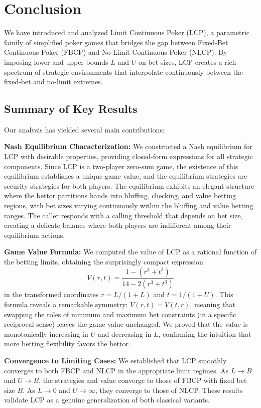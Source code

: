 \documentclass[../../main/main.tex]{subfiles}
\begin{document}
\section{Conclusion}
\label{sec:conclusion}
We have introduced and analyzed Limit Continuous Poker (LCP), a parametric family of simplified poker games that bridges the gap between Fixed-Bet Continuous Poker (FBCP) and No-Limit Continuous Poker (NLCP). By imposing lower and upper bounds $L$ and $U$ on bet sizes, LCP creates a rich spectrum of strategic environments that interpolate continuously between the fixed-bet and no-limit extremes.

\subsection{Summary of Key Results}

Our analysis has yielded several main contributions:

\textbf{Nash Equilibrium Characterization:} We constructed a Nash equilibrium for LCP with desirable properties, providing closed-form expressions for all strategic components. Since LCP is a two-player zero-sum game, the existence of this equilibrium establishes a unique game value, and the equilibrium strategies are security strategies for both players. The equilibrium exhibits an elegant structure where the bettor partitions hands into bluffing, checking, and value betting regions, with bet sizes varying continuously within the bluffing and value betting ranges. The caller responds with a calling threshold that depends on bet size, creating a delicate balance where both players are indifferent among their equilibrium actions.

\textbf{Game Value Formula:} We computed the value of LCP as a rational function of the betting limits, obtaining the surprisingly compact expression
\[
V(r,t) = \frac{1 - (r^3 + t^3)}{14 - 2(r^3 + t^3)}
\]
in the transformed coordinates $r = L/(1+L)$ and $t = 1/(1+U)$. This formula reveals a remarkable symmetry: $V(r,t) = V(t,r)$, meaning that swapping the roles of minimum and maximum bet constraints (in a specific reciprocal sense) leaves the game value unchanged. We proved that the value is monotonically increasing in $U$ and decreasing in $L$, confirming the intuition that more betting flexibility favors the bettor.

\textbf{Convergence to Limiting Cases:} We established that LCP smoothly converges to both FBCP and NLCP in the appropriate limit regimes. As $L \to B$ and $U \to B$, the strategies and value converge to those of FBCP with fixed bet size $B$. As $L \to 0$ and $U \to \infty$, they converge to those of NLCP. These results validate LCP as a genuine generalization of both classical variants.
\end{document}
